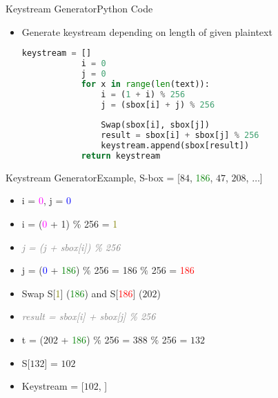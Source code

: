 \documentclass[
	aspectratio=169,	%
	onlytextwidth,		%
	t					%
	]{beamer}
\begin{document}
\begin{frame}[fragile]{Keystream Generator}{Python Code}
	\begin{itemize}
		\item Generate keystream depending on length of given plaintext
		\begin{lstlisting}[language=Python]
			keystream = []
			i = 0
			j = 0
			for x in range(len(text)):
				i = (1 + i) % 256
				j = (sbox[i] + j) % 256
				
				Swap(sbox[i], sbox[j])
				result = sbox[i] + sbox[j] % 256
				keystream.append(sbox[result])   
			return keystream   
		\end{lstlisting}
	\end{itemize}
\end{frame}

\begin{frame}[fragile]{Keystream Generator}{Example, S-box = [$84$, \textcolor{green}{186}, $47$, $208$, $\dots$]}
	\begin{itemize}
		\item i = \textcolor{magenta}{0}, j = \textcolor{blue}{0}
		\item i = (\textcolor{magenta}{0} + 1) $\%$ 256 = \textcolor{olive}{1}
		\item \textit{\textcolor{gray}{j = (j + sbox[i]) \% 256}}
		\item j = (\textcolor{blue}{0} + \textcolor{green}{186}) $\%$ 256 = 186 $\%$ 256 = \textcolor{red}{186}
	\end{itemize}
	\medskip
	\begin{itemize}
		\item Swap S[\textcolor{olive}{1}] (\textcolor{green}{186}) and S[\textcolor{red}{186}] ($202$)
		\item \textit{\textcolor{gray}{result = sbox[i] + sbox[j] \% 256}}
		\item t = ($202$ + \textcolor{green}{186}) $\%$ 256 = 388 $\%$ 256 = $132$
		\item S[$132$] = $102$
		\item Keystream = [$102$, ]
	\end{itemize}
\end{frame}
\end{document}
